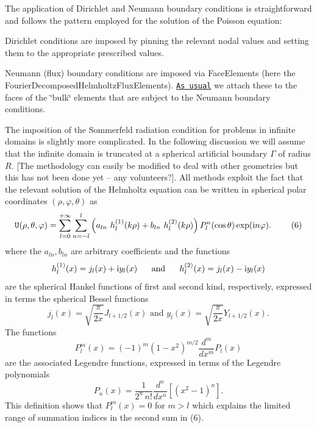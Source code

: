 The application of Dirichlet and Neumann boundary conditions is straightforward and follows the pattern employed for the solution of the Poisson equation\+:
\begin{DoxyItemize}
\item Dirichlet conditions are imposed by pinning the relevant nodal values and setting them to the appropriate prescribed values.
\item Neumann (flux) boundary conditions are imposed via {\ttfamily Face\+Elements} (here the {\ttfamily Fourier\+Decomposed\+Helmholtz\+Flux\+Elements}). \href{../../../poisson/two_d_poisson_flux_bc/html/index.html}{\tt As usual} we attach these to the faces of the \char`\"{}bulk\char`\"{} elements that are subject to the Neumann boundary conditions.
\end{DoxyItemize}The imposition of the Sommerfeld radiation condition for problems in infinite domains is slightly more complicated. In the following discussion we will assume that the infinite domain is truncated at a spherical artificial boundary $ \Gamma $ of radius $ R. $ \mbox{[}The methodology can easily be modified to deal with other geometries but this has not been done yet -- any volunteers?\mbox{]}. All methods exploit the fact that the relevant solution of the Helmholtz equation can be written in spherical polar coordinates $ (\rho,\varphi,\theta) $ as \[ {\tt U}(\rho,\theta,\varphi)= \sum_{l=0}^{+\infty}\sum_{n=-l}^{l} \left( a_{ln} \ h_{l}^{(1)}(k\rho)+ b_{ln} \ h_{l}^{(2)}(k\rho) \right)P_{l}^{n} (\cos\theta)\exp({\rm i} n \varphi). \ \ \ \ \ \ \ (6) \] where the $a_{ln}, b_{ln} $ are arbitrary coefficients and the functions \[ h_{l}^{(1)}(x)=j_{l}(x)+{\rm i} y_{l}(x) \mbox{ \ \ \ \ and \ \ \ \ } h_{l}^{(2)}(x)=j_{l}(x)-{\rm i} y_{l}(x) \] are the spherical Hankel functions of first and second kind, respectively, expressed in terms the spherical Bessel functions \[ j_{l}(x)=\sqrt{\frac{\pi}{2x}}J_{l+1/2}(x) \mbox{ \ \ \ \ and \ \ \ \ } y_{l}(x)=\sqrt{\frac{\pi}{2x}}Y_{l+1/2}(x). \] The functions \[ P_{l}^{m}(x)=(-1)^{m}(1-x^2)^{m/2}\frac{d^m}{dx^m}P_{l}(x) \] are the associated Legendre functions, expressed in terms of the Legendre polynomials \[ P_{n}(x)=\frac{1}{2^{n} \, n!}\frac{d^n}{dx^n}[(x^2-1)^{n}]. \] This definition shows that $ P_{l}^{m}(x)=0 $ for $ m>l $ which explains the limited range of summation indices in the second sum in (6).

